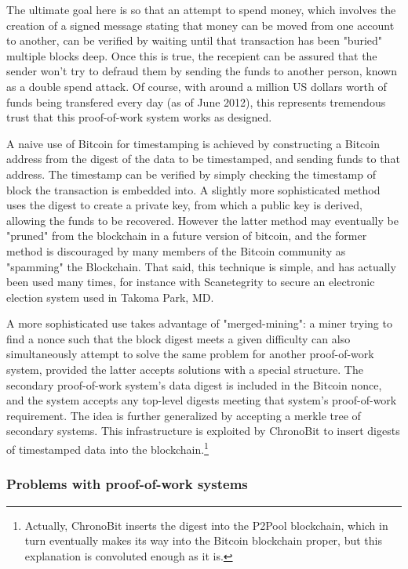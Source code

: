 \documentclass{article}
\begin{document}
The ultimate goal here is so that an attempt to spend money, which involves the
creation of a signed message stating that money can be moved from one account
to another, can be verified by waiting until that transaction has been "buried"
multiple blocks deep. Once this is true, the recepient can be assured that the
sender won't try to defraud them by sending the funds to another person, known
as a double spend attack. Of course, with around a million US dollars worth of
funds being transfered every day (as of June 2012), this represents tremendous
trust that this proof-of-work system works as designed.

A naive use of Bitcoin for timestamping is achieved by constructing a Bitcoin
address from the digest of the data to be timestamped, and sending funds to
that address. The timestamp can be verified by simply checking the timestamp of
block the transaction is embedded into. A slightly more sophisticated method
uses the digest to create a private key, from which a public key is derived,
allowing the funds to be recovered. However the latter method may eventually be
"pruned" from the blockchain in a future version of bitcoin, and the former
method is discouraged by many members of the Bitcoin community as "spamming"
the Blockchain. That said, this technique is simple, and has actually been used
many times, for instance with Scanetegrity to secure an electronic election
system used in Takoma Park, MD.\cite{cryptoeprint:2011:677}

A more sophisticated use takes advantage of "merged-mining": a miner trying to
find a nonce such that the block digest meets a given difficulty can also
simultaneously attempt to solve the same problem for another proof-of-work
system, provided the latter accepts solutions with a special structure. The
secondary proof-of-work system's data digest is included in the Bitcoin nonce,
and the system accepts any top-level digests meeting that system's
proof-of-work requirement. The idea is further generalized by accepting a
merkle tree of secondary systems. This infrastructure is exploited by
ChronoBit\cite{chronobit_github} to insert digests of timestamped data into the
blockchain.\footnote{Actually, ChronoBit inserts the digest into the P2Pool
blockchain, which in turn eventually makes its way into the Bitcoin blockchain
proper, but this explanation is convoluted enough as it is.}

\subsubsection{Problems with proof-of-work systems}
\end{document}
